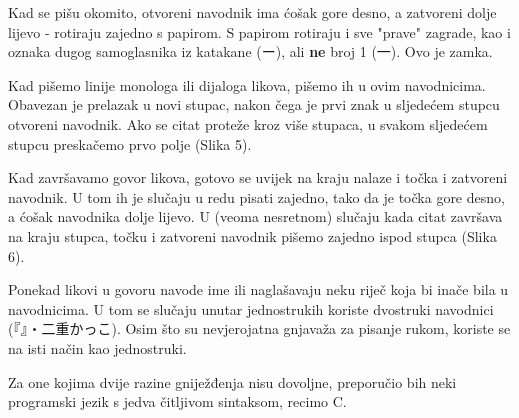 	Kad se pišu okomito, otvoreni navodnik ima ćošak gore desno, a zatvoreni dolje lijevo - rotiraju zajedno s papirom. S papirom rotiraju i sve "prave" zagrade, kao i oznaka dugog samoglasnika iz katakane (ー), ali \textbf{ne} broj 1 (一). Ovo je zamka.
	
	Kad pišemo linije monologa ili dijaloga likova, pišemo ih u ovim navodnicima. Obavezan je prelazak u novi stupac, nakon čega je prvi znak u sljedećem stupcu otvoreni navodnik. Ako se citat proteže kroz više stupaca, u svakom sljedećem stupcu preskačemo prvo polje (Slika 5).

	Kad završavamo govor likova, gotovo se uvijek na kraju nalaze i točka i zatvoreni navodnik. U tom ih je slučaju u redu pisati zajedno, tako da je točka gore desno, a ćošak navodnika dolje lijevo. U (veoma nesretnom) slučaju kada citat završava na kraju stupca, točku i zatvoreni navodnik pišemo zajedno ispod stupca (Slika 6).
	
	Ponekad likovi u govoru navode ime ili naglašavaju neku riječ koja bi inače bila u navodnicima. U tom se slučaju unutar jednostrukih koriste dvostruki navodnici\\ (『』・二重かっこ). Osim što su nevjerojatna gnjavaža za pisanje rukom, koriste se na isti način kao jednostruki.
	
	Za one kojima dvije razine gniježđenja nisu dovoljne, preporučio bih neki programski jezik s jedva čitljivom sintaksom, recimo C.
	

